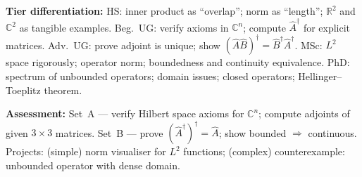 \documentclass[11pt,a4paper]{article}
\begin{document}
\begin{tcolorbox}[modulebox, title={Module~I.1 / L01: The Hilbert Space of Quantum States}]
\medskip\textbf{Tier differentiation:}
HS: inner product as ``overlap''; norm as ``length''; $\mathbb{R}^2$ and $\mathbb{C}^2$ as tangible examples.
Beg.\ UG: verify axioms in $\mathbb{C}^n$; compute $\hat{A}^\dagger$ for explicit matrices.
Adv.\ UG: prove adjoint is unique; show $(\hat{A}\hat{B})^\dagger = \hat{B}^\dagger\hat{A}^\dagger$.
MSc: $L^2$ space rigorously; operator norm; boundedness and continuity equivalence.
PhD: spectrum of unbounded operators; domain issues; closed operators; Hellinger--Toeplitz theorem.

\medskip\textbf{Assessment:}
Set~A --- verify Hilbert space axioms for $\mathbb{C}^n$; compute adjoints of given $3\times 3$ matrices.
Set~B --- prove $(\hat{A}^\dagger)^\dagger = \hat{A}$; show bounded $\Rightarrow$ continuous.
Projects: (simple) norm visualiser for $L^2$ functions; (complex) counterexample: unbounded operator with dense domain.
\end{tcolorbox}

\medskip
\end{document}
